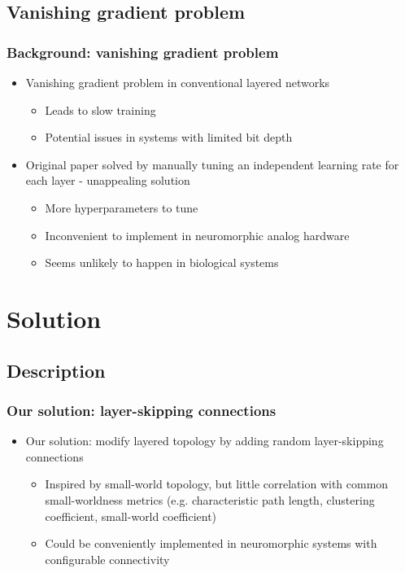\documentclass[pdf]{beamer}
\begin{document}
\subsection{Vanishing gradient problem}
\begin{frame}
	\frametitle{Background: vanishing gradient problem}
	\begin{itemize}
		\item<1-> Vanishing gradient problem in conventional layered networks
		\begin{itemize}
			\item<2-> Leads to slow training
			\item<3-> Potential issues in systems with limited bit depth
		\end{itemize}
		\item<4-> Original paper solved by manually tuning an independent learning rate for each layer - unappealing solution
		\begin{itemize}
			\item<5-> More hyperparameters to tune
			\item<6-> Inconvenient to implement in neuromorphic analog hardware
			\item<7-> Seems unlikely to happen in biological systems
		\end{itemize}
	\end{itemize}
\end{frame}

\section{Solution}
\subsection{Description}
\begin{frame}
	\frametitle{Our solution: layer-skipping connections}
	\begin{itemize}
		\item<1-> Our solution: modify layered topology by adding random layer-skipping connections
		\begin{itemize}
			\item<2-> Inspired by small-world topology, but little correlation with common small-worldness metrics (e.g. characteristic path length, clustering coefficient, small-world coefficient)
			\item<3-> Could be conveniently implemented in neuromorphic systems with configurable connectivity
		\end{itemize}
	\end{itemize}
\end{frame}
\end{document}
